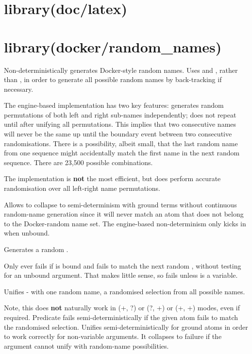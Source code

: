 \chapter{library(doc/latex)}\label{sec:latex}

\begin{description}
\end{description}

\chapter{library(docker/random_names)}\label{sec:randomnames}

\begin{description}
Non-deterministically generates Docker-style random names. Uses
 and , rather than , in
order to generate all possible random names by back-tracking if
necessary.

The engine-based implementation has two key features: generates
random permutations of both left and right sub-names independently;
does not repeat until after unifying all permutations. This implies
that two consecutive names will never be the same up until the
boundary event between two consecutive randomisations. There is a
possibility, albeit small, that the last random name from one
sequence might accidentally match the first name in the next random
sequence. There are 23,500 possible combinations.

The implementation is \textbf{not} the most efficient, but does perform
accurate randomisation over all left-right name permutations.

Allows  to collapse to semi-determinism with ground terms
without continuous random-name generation since it will never match
an atom that does not belong to the Docker-random name set. The
engine-based non-determinism only kicks in when  unbound.

Generates a random .

Only ever fails if  is bound and fails to match the next random
, without testing for an unbound argument. That makes little
sense, so fails unless  is a variable.

Unifies - with one random name, a randomised selection from
all possible names.

Note, this does \textbf{not} naturally work in (+, ?) or (?, +) or (+, +)
modes, even if required. Predicate  fails
semi-deterministically if the given atom fails to match the
randomised selection. Unifies semi-deterministically for ground
atoms in order to work correctly for non-variable arguments. It
collapses to failure if the argument cannot unify with random-name
possibilities.
\end{description}

